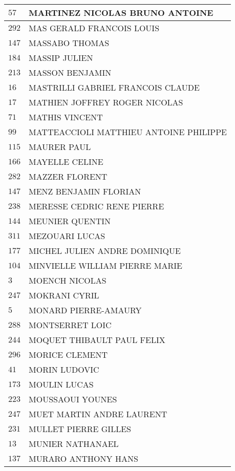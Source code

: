 \begin{xltabular}{\linewidth}{|l|X|}
    $57$ & MARTINEZ NICOLAS BRUNO ANTOINE \\
    \hline
    $292$ & MAS GERALD FRANCOIS LOUIS \\
    \hline
    $147$ & MASSABO THOMAS \\
    \hline
    $184$ & MASSIP JULIEN \\
    \hline
    $213$ & MASSON BENJAMIN \\
    \hline
    $16$ & MASTRILLI GABRIEL FRANCOIS CLAUDE \\
    \hline
    $17$ & MATHIEN JOFFREY ROGER NICOLAS \\
    \hline
    $71$ & MATHIS VINCENT \\
    \hline
    $99$ & MATTEACCIOLI MATTHIEU ANTOINE PHILIPPE \\
    \hline
    $115$ & MAURER PAUL \\
    \hline
    $166$ & MAYELLE CELINE \\
    \hline
    $282$ & MAZZER FLORENT \\
    \hline
    $147$ & MENZ BENJAMIN FLORIAN \\
    \hline
    $238$ & MERESSE CEDRIC RENE PIERRE \\
    \hline
    $144$ & MEUNIER QUENTIN \\
    \hline
    $311$ & MEZOUARI LUCAS \\
    \hline
    $177$ & MICHEL JULIEN ANDRE DOMINIQUE \\
    \hline
    $104$ & MINVIELLE WILLIAM PIERRE MARIE \\
    \hline
    $3$ & MOENCH NICOLAS \\
    \hline
    $247$ & MOKRANI CYRIL \\
    \hline
    $5$ & MONARD PIERRE-AMAURY \\
    \hline
    $288$ & MONTSERRET LOIC \\
    \hline
    $244$ & MOQUET THIBAULT PAUL FELIX \\
    \hline
    $296$ & MORICE CLEMENT \\
    \hline
    $41$ & MORIN LUDOVIC \\
    \hline
    $173$ & MOULIN LUCAS \\
    \hline
    $223$ & MOUSSAOUI YOUNES \\
    \hline
    $247$ & MUET MARTIN ANDRE LAURENT \\
    \hline
    $231$ & MULLET PIERRE GILLES \\
    \hline
    $13$ & MUNIER NATHANAEL \\
    \hline
    $137$ & MURARO ANTHONY HANS \\

\end{xltabular}
